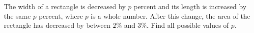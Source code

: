 The width of a rectangle is decreased by $p$ percent and its length is increased by the same $p$ percent, where $p$ is a whole number. After this change, the area of the rectangle has decreased by between $2\%$ and $3\%$. Find all possible values of $p$.
